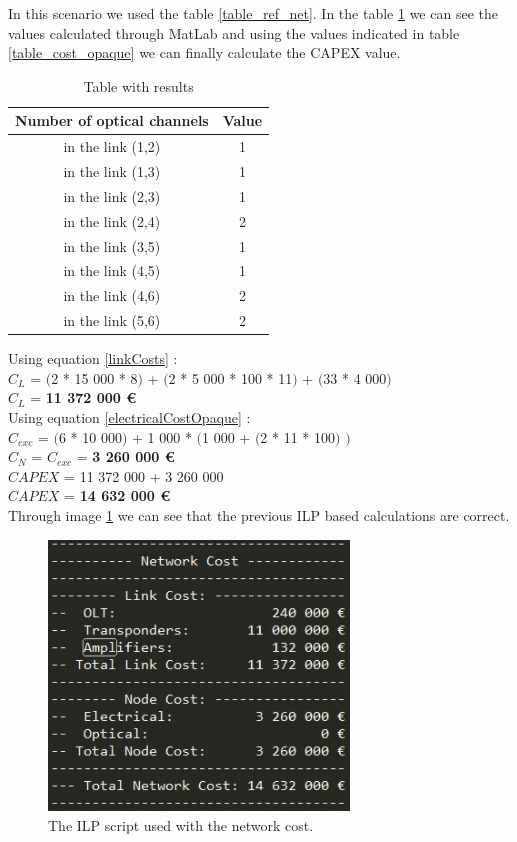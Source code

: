 In this scenario we used the table \ref{table_ref_net}. In the table \ref{result_ILP1_reference} we can see the values calculated through MatLab and using the values indicated in table \ref{table_cost_opaque} we can finally calculate the CAPEX value.
\begin{table}[h!]
\centering
\begin{tabular}{|| c | c||}
 \hline
 Number of optical channels & Value \\
 \hline\hline
 in the link (1,2) & 1 \\
 in the link (1,3) & 1 \\
 in the link (2,3) & 1 \\
 in the link (2,4) & 2 \\
 in the link (3,5) & 1 \\
 in the link (4,5) & 1 \\
 in the link (4,6) & 2 \\
 in the link (5,6) & 2 \\
 \hline
\end{tabular}
\caption{Table with results}
\label{result_ILP1_reference}
\end{table}

Using equation \ref{linkCosts} : \\
$C_L$ = $($2 * 15 000 * 8$)$ + $($2 * 5 000 * 100 * 11$)$ + $($33 * 4 000$)$ \\
$C_L$ = \textbf{11 372 000 \euro} \\


Using equation \ref{electricalCostOpaque} : \\
$C_{exc}$ = $($6 * 10 000$)$ + 1 000 * $($1 000 + $($2 * 11 * 100$)$ $)$ \\
$C_N$ = $C_{exc}$ = \textbf{3 260 000 \euro} \\

$CAPEX$ = 11 372 000 + 3 260 000 \\
$CAPEX$ = \textbf{14 632 000 \euro}\\

Through image \ref{scriptopaque_surv_ref_low} we can see that the previous ILP based calculations are correct.
\begin{figure}[h!]
\centering
\includegraphics[width=8cm]{sdf/opaque/figures/script_opaque_surv_ref_low}
\caption{The ILP script used with the network cost.}
\label{scriptopaque_surv_ref_low}
\end{figure}



